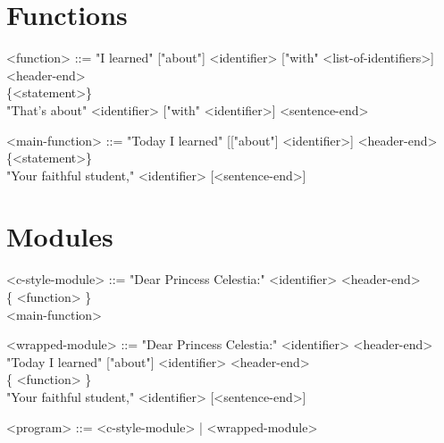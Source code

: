 \documentclass[12pt,a4paper]{article}
\begin{document}
\section{Functions}
\begin{grammar}

<function> ::= "I learned" ["about"] <identifier> ["with" <list-of-identifiers>] <header-end> \\
  \{<statement>\} \\
  "That's about" <identifier> ["with" <identifier>] <sentence-end>

<main-function> ::= "Today I learned" [["about"] <identifier>] <header-end> \\
  \{<statement>\} \\
  "Your faithful student," <identifier> [<sentence-end>]

\end{grammar}

\section{Modules}
\begin{grammar}

<c-style-module> ::= "Dear Princess Celestia:" <identifier> <header-end> \\
	\{ <function> \} \\
	<main-function>

<wrapped-module> ::= "Dear Princess Celestia:" <identifier> <header-end> \\
	"Today I learned" ["about"] <identifier> <header-end> \\
	\{ <function> \}\\
	"Your faithful student," <identifier> [<sentence-end>]
	
<program> ::= <c-style-module> | <wrapped-module>

\end{grammar}
\end{document}

